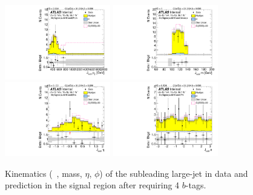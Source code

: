 \begin{figure}[htb!]
\begin{center}
\includegraphics[width=0.41\textwidth,angle=-90]{figures/boosted/Signal/b77_FourTag_Signal_sublHCand_Pt_m.pdf}
\includegraphics[width=0.41\textwidth,angle=-90]{figures/boosted/Signal/b77_FourTag_Signal_sublHCand_Mass_s.pdf}\\
\includegraphics[width=0.41\textwidth,angle=-90]{figures/boosted/Signal/b77_FourTag_Signal_sublHCand_Eta.pdf}
\includegraphics[width=0.41\textwidth,angle=-90]{figures/boosted/Signal/b77_FourTag_Signal_sublHCand_Phi.pdf}
  \caption{Kinematics (\pt~, mass, $\eta$, $\phi$) of the subleading large-\R jet in data and prediction in the signal region after requiring 4 $b$-tags. }
  \label{fig:boosted-4b-signal-ak10-subl}
\end{center}
\end{figure}


